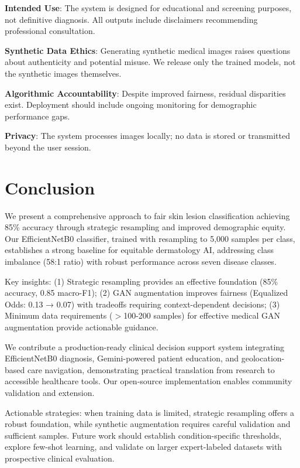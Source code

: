\documentclass[10pt, twocolumn, letterpaper]{article}
\begin{document}
\textbf{Intended Use}: The system is designed for educational and screening purposes, not definitive diagnosis. All outputs include disclaimers recommending professional consultation.

\textbf{Synthetic Data Ethics}: Generating synthetic medical images raises questions about authenticity and potential misuse. We release only the trained models, not the synthetic images themselves.

\textbf{Algorithmic Accountability}: Despite improved fairness, residual disparities    exist. Deployment should include ongoing monitoring for demographic performance gaps.

\textbf{Privacy}: The system processes images locally; no data is stored or transmitted beyond the user session.

\section{Conclusion}
We present a comprehensive approach to fair skin lesion classification achieving 85\% accuracy through strategic resampling and improved demographic equity. Our EfficientNetB0 classifier, trained with resampling to 5,000 samples per class, establishes a strong baseline for equitable dermatology AI, addressing class imbalance (58:1 ratio) with robust performance across seven disease classes.

Key insights: (1) Strategic resampling provides an effective foundation (85\% accuracy, 0.85 macro-F1); (2) GAN augmentation improves fairness (Equalized Odds: 0.13 → 0.07) with tradeoffs requiring context-dependent decisions; (3) Minimum data requirements ($>$100-200 samples) for effective medical GAN augmentation provide actionable guidance.

We contribute a production-ready clinical decision support system integrating EfficientNetB0 diagnosis, Gemini-powered patient education, and geolocation-based care navigation, demonstrating practical translation from research to accessible healthcare tools. Our open-source implementation enables community validation and extension.

Actionable strategies: when training data is limited, strategic resampling offers a robust foundation, while synthetic augmentation requires careful validation and sufficient samples. Future work should establish condition-specific thresholds, explore few-shot learning, and validate on larger expert-labeled datasets with prospective clinical evaluation.
\end{document}

